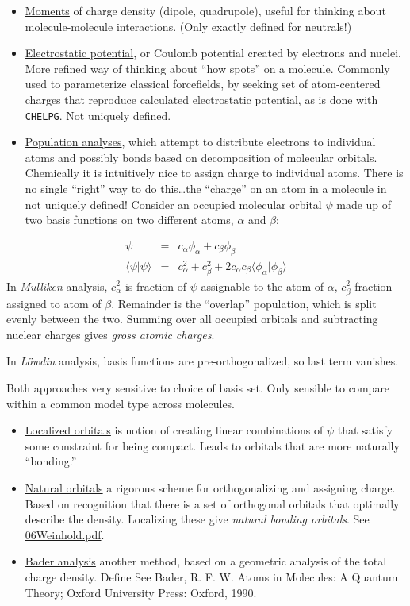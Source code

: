 \documentclass[11pt]{article}
\begin{document}
\begin{itemize}
\item \uline{Moments} of charge density (dipole, quadrupole), useful for thinking about molecule-molecule interactions.  (Only exactly defined for neutrals!)

\item \uline{Electrostatic potential}, or Coulomb potential created by electrons and nuclei.  More refined way of thinking about ``how spots'' on a molecule. Commonly used to parameterize classical forcefields, by seeking set of atom-centered charges that reproduce calculated electrostatic potential, as is done with \texttt{CHELPG}.  Not uniquely defined.

\item \uline{Population analyses}, which attempt to distribute electrons to individual atoms and possibly bonds based on decomposition of molecular orbitals.  Chemically it is intuitively nice to assign charge to individual atoms.  There is no single ``right'' way to do this\ldots the ``charge'' on an atom in a molecule in not uniquely defined!  Consider an occupied molecular orbital \(\psi\) made up of two basis functions on two different atoms, \(\alpha\) and \(\beta\):
\end{itemize}
\begin{eqnarray}
\psi &=& c_\alpha \phi_\alpha + c_\beta \phi_\beta \\
\langle \psi | \psi \rangle &=& c_\alpha^2 + c_\beta^2 + 2 c_\alpha c_\beta \langle\phi_\alpha | \phi_\beta\rangle
\end{eqnarray}
In \emph{Mulliken} analysis, \(c_\alpha^2\) is fraction of \(\psi\) assignable to the atom of \(\alpha\), \(c_\beta^2\) fraction assigned to atom of \(\beta\).  Remainder is the ``overlap'' population, which is split evenly between the two.  Summing over all occupied orbitals and subtracting nuclear charges gives \emph{gross atomic charges}.

In \emph{L\"{o}wdin} analysis, basis functions are pre-orthogonalized, so last term vanishes.

Both approaches very sensitive to choice of basis set. Only sensible to compare within a common model type across molecules.

\begin{itemize}
\item \uline{Localized orbitals} is notion of creating linear combinations of \(\psi\) that satisfy some constraint for being compact. Leads to orbitals that are more naturally ``bonding.''

\item \uline{Natural orbitals} a rigorous scheme for orthogonalizing and assigning charge.  Based on recognition that there is a set of orthogonal orbitals that optimally describe the density.  Localizing these give \emph{natural bonding orbitals}.  See \href{./Resources/06Weinhold.pdf}{06Weinhold.pdf}.

\item \uline{Bader analysis} another method, based on a geometric analysis of the total charge density.  Define See Bader, R. F. W. Atoms in Molecules: A Quantum Theory; Oxford University Press: Oxford, 1990.
\end{itemize}
\end{document}
